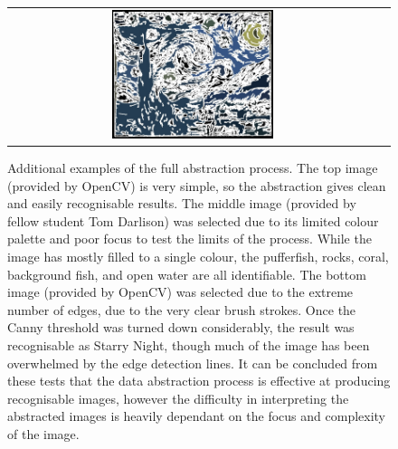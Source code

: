 \begin{figure}[h]
\begin{center}
\begin{tabular}{ c c }
        \includegraphics[width=0.45\textwidth]{Figures/starry_nightDA.jpg} 
    \end{tabular}
    \caption[Additional examples of the full abstraction process]{Additional examples of the full abstraction process. The top image (provided by OpenCV) is very simple, so the abstraction gives clean and easily recognisable results. The middle image (provided by fellow student Tom Darlison) was selected due to its limited colour palette and poor focus to test the limits of the process. While the image has mostly filled to a single colour, the pufferfish, rocks, coral, background fish, and open water are all identifiable. The bottom image (provided by OpenCV) was selected due to the extreme number of edges, due to the very clear brush strokes. Once the Canny threshold was turned down considerably, the result was recognisable as Starry Night, though much of the image has been overwhelmed by the edge detection lines. It can be concluded from these tests that the data abstraction process is effective at producing recognisable images, however the difficulty in interpreting the abstracted images is heavily dependant on the focus and complexity of the image.}
    \label{fig:FinalExtras}
    \end{center}
\end{figure}